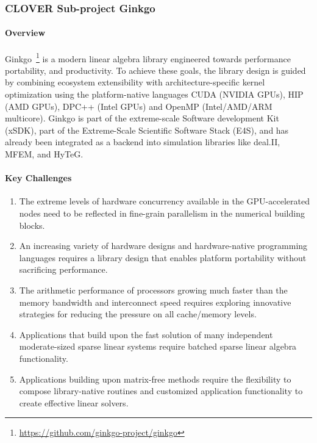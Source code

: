 \newpage
\subsubsection{ CLOVER Sub-project Ginkgo} \label{subsubsect:peeks}
\paragraph{Overview} 
Ginkgo~\footnote{\url{https://github.com/ginkgo-project/ginkgo}} is a modern
linear algebra library engineered towards performance portability, and
productivity. To achieve these goals, the library design is guided by combining
ecosystem extensibility with architecture-specific kernel optimization
using the platform-native languages CUDA (NVIDIA GPUs), HIP (AMD GPUs), DPC++
(Intel GPUs) and OpenMP (Intel/AMD/ARM multicore). Ginkgo is part of the
extreme-scale Software development Kit (xSDK), part of the Extreme-Scale
Scientific Software Stack (E4S), and has already been integrated as a backend
into simulation libraries like deal.II, MFEM, and HyTeG.



\paragraph{Key Challenges}
\begin{enumerate}
  \item The extreme levels of hardware concurrency available in the
		GPU-accelerated nodes need to be reflected in fine-grain parallelism in
		the numerical building blocks.
  \item An increasing variety of hardware designs and hardware-native
		programming languages requires a library design that enables platform
		portability without sacrificing performance.
  \item The arithmetic performance of processors growing much faster than the
		memory bandwidth and interconnect speed requires exploring innovative
		strategies for reducing the pressure on all cache/memory levels.
  \item Applications that build upon the fast solution of many independent
		moderate-sized sparse linear systems require batched sparse linear
		algebra functionality.
  \item Applications building upon matrix-free methods require the flexibility
		to compose library-native routines and customized application
		functionality to create effective linear solvers.
\end{enumerate}

